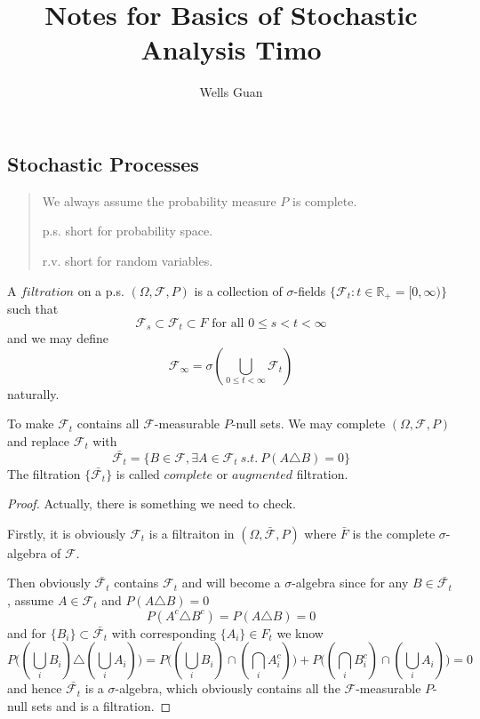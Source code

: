 \documentclass[lang=en, color=blue, ]{elegantbook}
\title{Notes for Basics of Stochastic Analysis Timo}
\author{Wells Guan}
\newcommand{\F}{\mathcal{F}}
\newcommand{\R}{\mathbb{R}}
\begin{document}


\chapter{}
\section{Stochastic Processes}
\begin{quotation}
We always assume the probability measure $P$ is complete.\par
p.s. short for probability space.\par
r.v. short for random variables.\par
\end{quotation}
\begin{definition}
A $filtration$ on a p.s. $(\Omega,\F,P)$ is a collection of $\sigma$-fields $\{\F_t:t\in \R_+ = [0,\infty)\}$ such that
\[\F_s\subset \F_t\subset F\text{ for all }0\leq s<t<\infty\]
and  we may define 
\[\F_{\infty} = \sigma(\bigcup_{0\leq t <\infty}\F_t)\]
naturally.
\end{definition}

\begin{definition}
To make $\F_t$ contains all $\F$-measurable $P$-null sets. We may complete $(\Omega,\F,P)$ and replace $\F_t$ with
\[\bar{\F_t}=\{B\in\F,\exists A\in \F_t\ s.t.\ P(A\triangle B) = 0 \}\]
The filtration $\{\bar{\F_t}\}$ is called $complete$ or $augmented$ filtration.
\end{definition}
\begin{proof}\par
Actually, there is something we need to check.\par
Firstly, it is obviously $\F_t$ is a filtraiton in $(\Omega, \bar{\F},P)$ where $\bar{F}$ is the complete $\sigma$-algebra of $\F$.\par
Then obviously $\bar{\F_t}$ contains $\F_t$ and will become a $\sigma$-algebra since for any $B\in \bar{\F_t}$, assume $A\in\F_t$ and $P(A\triangle B) = 0$
\[P(A^c\triangle B^c) = P(A\triangle B) = 0\]
and for $\{B_i\}\subset \bar{\F_t}$ with corresponding $\{A_i\}\in F_t$ we know
\[ P\big((\bigcup_i B_i) \triangle (\bigcup_i A_i)\big) = P\big((\bigcup_i B_i) \cap (\bigcap_i A_i^c)\big) + P\big((\bigcap_i B_i^c) \cap (\bigcup_i A_i)\big) = 0\]
and hence $\bar{\F_t}$ is a $\sigma$-algebra, which obviously contains all the $\F$-measurable $P$-null sets and is a filtration.
\end{proof}
\end{document}
